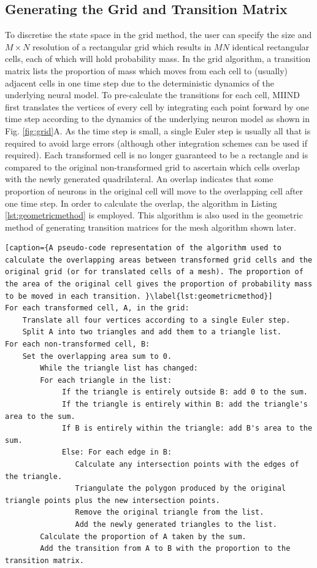 \documentclass[utf8]{frontiersSCNS} %
\begin{document}
\subsection{Generating the Grid and Transition Matrix}
\label{gridgenerate}
To discretise the state space in the grid method, the user can specify the size and $M\times N$ resolution of a rectangular grid which results in $MN$ identical rectangular cells, each of which will hold probability mass. In the grid algorithm, a transition matrix lists the proportion of mass which moves from each cell to (usually) adjacent cells in one time step due to the deterministic dynamics of the underlying neural model. To pre-calculate the transitions for each cell, MIIND first translates the vertices of every cell by integrating each point forward by one time step according to the dynamics of the underlying neuron model as shown in Fig. \ref{fig:grid}A. As the time step is small, a single Euler step is usually all that is required to avoid large errors (although other integration schemes can be used if required). Each transformed cell is no longer guaranteed to be a rectangle and is compared to the original non-transformed grid to ascertain which cells overlap with the newly generated quadrilateral. An overlap indicates that some proportion of neurons in the original cell will move to the overlapping cell after one time step. In order to calculate the overlap, the algorithm in Listing \ref{lst:geometricmethod} is employed. This algorithm is also used in the geometric method of generating transition matrices for the mesh algorithm shown later.

\begin{lstlisting}[caption={A pseudo-code representation of the algorithm used to calculate the overlapping areas between transformed grid cells and the original grid (or for translated cells of a mesh). The proportion of the area of the original cell gives the proportion of probability mass to be moved in each transition. }\label{lst:geometricmethod}]
For each transformed cell, A, in the grid:
	Translate all four vertices according to a single Euler step.
	Split A into two triangles and add them to a triangle list.
For each non-transformed cell, B:
	Set the overlapping area sum to 0.
		While the triangle list has changed:
		For each triangle in the list:
			 If the triangle is entirely outside B: add 0 to the sum.
			 If the triangle is entirely within B: add the triangle's area to the sum.
			 If B is entirely within the triangle: add B's area to the sum.
			 Else: For each edge in B:
				Calculate any intersection points with the edges of the triangle.
				Triangulate the polygon produced by the original triangle points plus the new intersection points.
				Remove the original triangle from the list.
				Add the newly generated triangles to the list.
		Calculate the proportion of A taken by the sum.
		Add the transition from A to B with the proportion to the transition matrix.	
\end{lstlisting}
\end{document}
